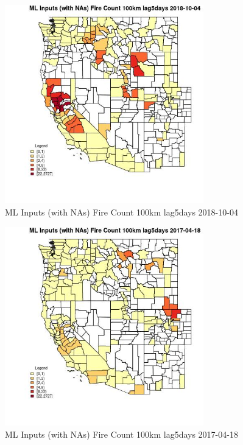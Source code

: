 \begin{figure} 
\centering  
\includegraphics[width=0.77\textwidth]{Code_Outputs/Report_ML_input_PM25_Step4_part_f_de_duplicated_aveswNAs_CountyFire_Count_100km_lag5daysMean2018-10-04.jpg} 
\caption{\label{fig:Report_ML_input_PM25_Step4_part_f_de_duplicated_aveswNAsCountyFire_Count_100km_lag5daysMean2018-10-04}ML Inputs (with NAs) Fire Count 100km lag5days 2018-10-04} 
\end{figure} 
 

\begin{figure} 
\centering  
\includegraphics[width=0.77\textwidth]{Code_Outputs/Report_ML_input_PM25_Step4_part_f_de_duplicated_aveswNAs_CountyFire_Count_100km_lag5daysMean2017-04-18.jpg} 
\caption{\label{fig:Report_ML_input_PM25_Step4_part_f_de_duplicated_aveswNAsCountyFire_Count_100km_lag5daysMean2017-04-18}ML Inputs (with NAs) Fire Count 100km lag5days 2017-04-18} 
\end{figure} 
 

